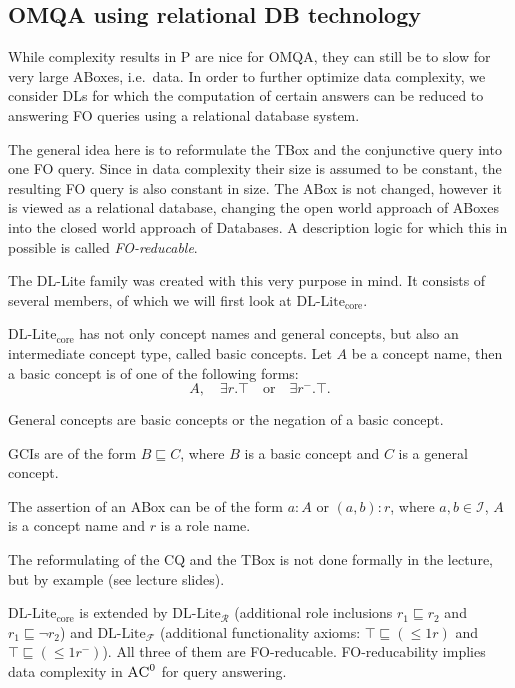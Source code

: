 \subsection{OMQA using relational DB technology}
While complexity results in \textsc{P} are nice for OMQA, they can still be to slow for very large ABoxes, i.e.\ data.
In order to further optimize data complexity, we consider DLs for which the computation of certain answers
can be reduced to answering FO queries using a relational database system.

The general idea here is to reformulate the TBox and the conjunctive query into one FO query.
Since in data complexity their size is assumed to be constant, the resulting FO query is also constant in size.
The ABox is not changed, however it is viewed as a relational database, changing the open world approach of ABoxes
into the closed world approach of Databases.
A description logic for which this in possible is called \textit{FO-reducable}.

The DL-Lite family was created with this very purpose in mind.
It consists of several members, of which we will first look at $\text{DL-Lite}_{\text{core}}$.

\begin{mdframed}[frametitle= Syntax of $\text{DL-Lite}_{\text{core}}$]
	$\text{DL-Lite}_{\text{core}}$ has not only concept names and general concepts, but also an intermediate concept type,
	called basic concepts.
	Let $A$ be a concept name, then a basic concept is of one of the following forms:
	\[
		A, \quad \exists r.\top \quad\text{or}\quad \exists r^-.\top
	.\]

	General concepts are basic concepts or the negation of a basic concept.

	GCIs are of the form $B \sqsubseteq C$, where $B$ is a basic concept and $C$ is a general concept.

	The assertion of an ABox can be of the form $a:A$ or $(a,b):r$, where $a,b \in \mathscr{I}$, $A$ is a concept name and $r$ is a role name.
\end{mdframed}

The reformulating of the CQ and the TBox is not done formally in the lecture, but by example (see lecture slides).

$\text{DL-Lite}_{\text{core}}$ is extended by $\text{DL-Lite}_{\mathcal{R}}$ (additional role inclusions $r_1 \sqsubseteq r_2$ and $r_1 \sqsubseteq \neg r_2$)
and $\text{DL-Lite}_{\mathcal{F}}$ (additional functionality axioms: $\top \sqsubseteq ( \leq 1r)$ and $\top \sqsubseteq ( \leq 1r^-)$).
All three of them are FO-reducable.
FO-reducability implies data complexity in $\textsc{AC}^0$ for query answering.
